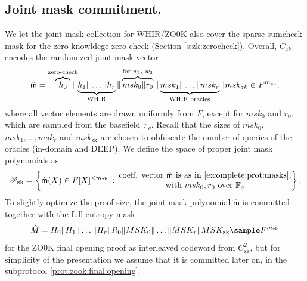 
\subsection{Joint mask commitment.}

We let the joint mask collection for WHIR/ZO0K also cover the sparse sumcheck mask for the zero-knowldege zero-check (Section \ref{s:zk:zerocheck}).
Overall, $C_{zk}$ encodes the randomized joint mask vector  
\begin{equation}
\label{e:complete:prot:masks}
\hat{\mathsf m} = \overbrace{h_0}^\text{zero-check} \hspace*{-3mm}\| \underbrace{h_1\|\ldots \|h_r}_\text{WHIR} \| \overbrace{msk_0\| r_0}^\text{for $w_1$, $w_2$} \| \underbrace{msk_1\| \ldots \| msk_r}_\text{WHIR oracles}\| msk_{zk} 
\in F^{m_\text{zk}},
\end{equation}
where all vector elements are drawn uniformly from $F$, except for $msk_0$ and $r_0$, which are sampled from the basefield $\mathbb F_q$.
Recall that the sizes of $msk_0$, $msk_1,\ldots, msk_r$ and $msk_\text{zk}$ are chosen to obfuscate the number of queries of the oracles (in-domain and DEEP).
We define the space of proper joint mask polynomials as
\begin{equation}
\label{e:space:mask:polys}
\mathscr P_\text{zk} =
\left\{
\hat{\mathsf m}(X) \in F[X]^{<m_\text{zk}} \::\:
\begin{matrix}
\text{coeff. vector $\hat{\mathsf m}$  is as in \eqref{e:complete:prot:masks}},
\\
\text{with $msk_0, r_0$ over $\mathbb F_q$}
\end{matrix}
\right\}.
\end{equation}
To slightly optimize the proof size, the joint mask polynomial $\hat{\mathsf m}$ is committed together with the full-entropy mask 
\begin{equation}
\label{e:full:entropy:mask}
\hat M = H_0 \| H_1\| \ldots \|H_r\|R_0\|MSK_0\|\ldots\|MSK_r\|MSK_\text{zk} \sample F^{m_\text{zk}}    
\end{equation}
for the ZO0K final opening proof as interleaved codeword from $C_\text{zk}^2$, but for simplicity of the presentation we assume that it is committed later on, in the subprotocol \ref{prot:zook:final:opening}.




